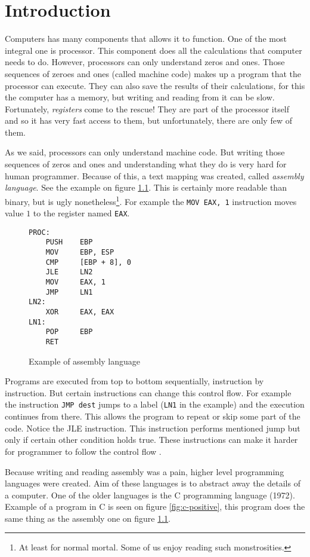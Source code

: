 \chapter{Introduction}
Computers has many components that allows it to function. One of the most integral one is processor.
This component does all the calculations that computer needs to do. However, processors can only understand
zeros and ones. Those sequences of zeroes and ones (called machine code) makes up a program that the processor can execute.
They can also save the results of their calculations, for this the computer
has a memory, but writing and reading from it can be slow. Fortunately, \textit{registers} come to
the rescue! They are part of the processor itself and so it has very fast access to them, but unfortunately,
there are only few of them.

As we said, processors can only understand machine code. But writing those sequences of zeros and ones and understanding
what they do is very hard for human programmer. Because of this, a text mapping was created,
called \textit{assembly language}. See the example on figure \ref{fig:assembly-example}.
This is certainly more readable than binary, but is ugly nonetheless\footnote{At least for normal mortal. Some of us enjoy reading such monstrosities.}.
For example the \texttt{MOV EAX, 1} instruction moves value $1$ to the register named \texttt{EAX}.

\begin{figure}\label{fig:assembly-example}
\begin{lstlisting}
PROC:
    PUSH    EBP
    MOV     EBP, ESP
    CMP     [EBP + 8], 0
    JLE     LN2
    MOV     EAX, 1
    JMP     LN1
LN2:
    XOR     EAX, EAX
LN1:
    POP     EBP
    RET
\end{lstlisting}
\caption{Example of assembly language}
\end{figure}

Programs are executed from top to bottom sequentially, instruction by instruction. But certain instructions can change this control flow. For example the instruction \texttt{JMP dest}
jumps to a label (\texttt{LN1} in the example) and the execution continues from there. This allows the program to repeat or skip some part of the code.
Notice the JLE instruction. This instruction performs mentioned jump but only if certain other condition holds true.
These instructions can make it harder for programmer to follow the control flow \cite{gotobad}.

Because writing and reading assembly was a pain, higher level programming languages were created.
Aim of these languages is to abstract away the details of a computer. One of the older languages is the C programming language (1972).
Example of a program in C is seen on figure \ref{fig:c-positive}, this program does the same thing as the assembly one on figure \ref{fig:assembly-example}.

